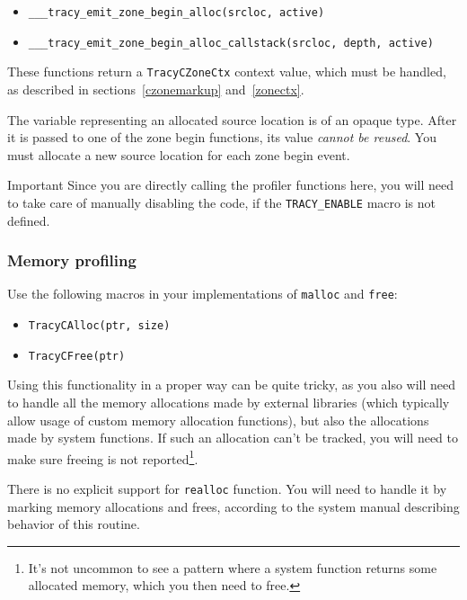 \documentclass[hidelinks,titlepage,a4paper]{article}
\begin{document}
\begin{itemize}
\item \texttt{\_\_\_tracy\_emit\_zone\_begin\_alloc(srcloc, active)}
\item \texttt{\_\_\_tracy\_emit\_zone\_begin\_alloc\_callstack(srcloc, depth, active)}
\end{itemize}

These functions return a \texttt{TracyCZoneCtx} context value, which must be handled, as described in sections~\ref{czonemarkup} and~\ref{zonectx}.

The variable representing an allocated source location is of an opaque type. After it is passed to one of the zone begin functions, its value \emph{cannot be reused}. You must allocate a new source location for each zone begin event.

\begin{bclogo}[
noborder=true,
couleur=black!5,
logo=\bcbombe
]{Important}
Since you are directly calling the profiler functions here, you will need to take care of manually disabling the code, if the \texttt{TRACY\_ENABLE} macro is not defined.
\end{bclogo}

\subsubsection{Memory profiling}

Use the following macros in your implementations of \texttt{malloc} and \texttt{free}:

\begin{itemize}
\item \texttt{TracyCAlloc(ptr, size)}
\item \texttt{TracyCFree(ptr)}
\end{itemize}

Using this functionality in a proper way can be quite tricky, as you also will need to handle all the memory allocations made by external libraries (which typically allow usage of custom memory allocation functions), but also the allocations made by system functions. If such an allocation can't be tracked, you will need to make sure freeing is not reported\footnote{It's not uncommon to see a pattern where a system function returns some allocated memory, which you then need to free.}.

There is no explicit support for \texttt{realloc} function. You will need to handle it by marking memory allocations and frees, according to the system manual describing behavior of this routine.
\end{document}
